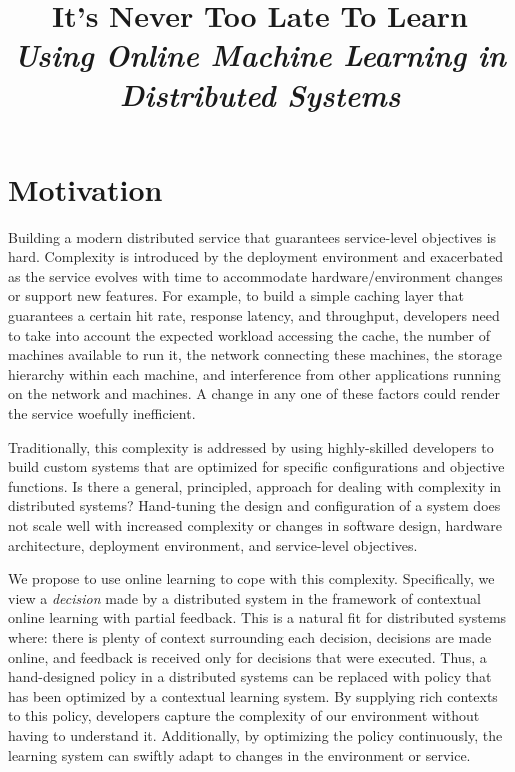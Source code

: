 \documentclass[a4paper,twocolumn]{article}
\title{
  It's Never Too Late To Learn\\
  \emph{Using Online Machine Learning in Distributed Systems}
}
\author{}
\date{}
\begin{document}
\maketitle

\section{Motivation}

Building a modern distributed service that guarantees service-level objectives
is hard. Complexity is introduced by the deployment environment and exacerbated
as the service evolves with time to accommodate hardware/environment changes or
support new features.
For example, to build a simple caching layer that guarantees a certain hit rate,
response latency, and throughput, developers need to take into account the
expected workload accessing the cache, the number of machines available to run
it, the network connecting these machines, the storage hierarchy within each
machine, and interference from other applications running on the network and
machines.  A change in any one of these factors could render the service
woefully inefficient.

Traditionally, this complexity is addressed by using highly-skilled developers
to build custom systems that are optimized for specific configurations and
objective functions.  Is there a general, principled, approach for dealing with
complexity in distributed systems? Hand-tuning the design and configuration of a
system does not scale well with increased complexity or changes in software
design, hardware architecture, deployment environment, and service-level
objectives.

We propose to use online learning to cope with this complexity. Specifically, we
view a {\em decision} made by a distributed system in the framework of
contextual online learning with partial feedback. This is a natural fit for
distributed systems where: there is plenty of context surrounding each decision,
decisions are made online, and feedback is received only for decisions that were
executed.  Thus, a hand-designed policy in a distributed systems can be replaced
with policy that has been optimized by a contextual learning system. By
supplying rich contexts to this policy, developers capture the complexity of our
environment without having to understand it. Additionally, by optimizing the
policy continuously, the learning system can swiftly adapt to changes in the
environment or service.
\end{document}
